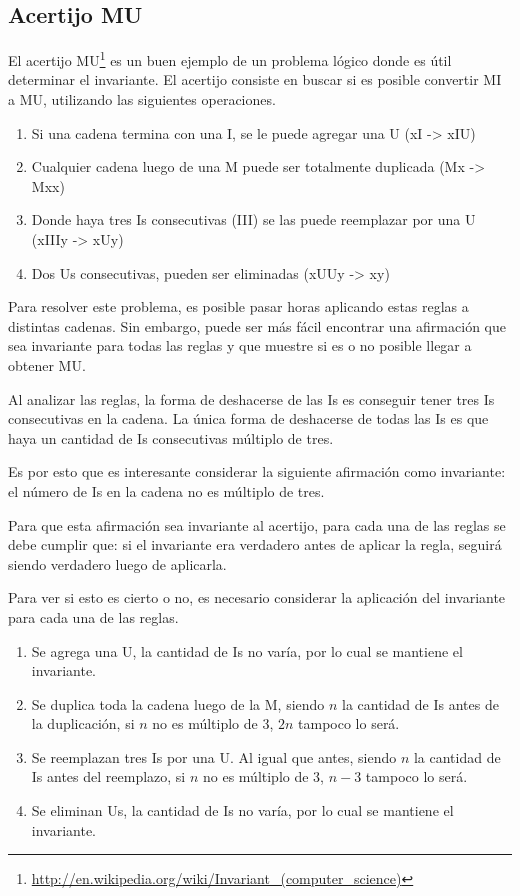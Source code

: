 \newpage
\begin{subappendices}
\section{Acertijo MU}

El acertijo MU\footnote{%
\url{http://en.wikipedia.org/wiki/Invariant\_(computer\_science)}} es un buen
ejemplo de un problema lógico donde es útil determinar el invariante.  El
acertijo consiste en buscar si es posible convertir MI a MU, utilizando las
siguientes operaciones.

\begin{enumerate}
\item Si una cadena termina con una I, se le puede agregar una U (xI -> xIU)
\item Cualquier cadena luego de una M puede ser totalmente duplicada (Mx ->
Mxx)
\item Donde haya tres Is consecutivas (III) se las puede reemplazar por una U
(xIIIy -> xUy)
\item Dos Us consecutivas, pueden ser eliminadas (xUUy -> xy)
\end{enumerate}

Para resolver este problema, es posible pasar horas aplicando estas reglas
a distintas cadenas.  Sin embargo, puede ser más fácil encontrar una
afirmación que sea invariante para todas las reglas y que muestre si es o
no posible llegar a obtener MU.

Al analizar las reglas, la forma de deshacerse de las Is es conseguir tener
tres Is consecutivas en la cadena.  La única forma de deshacerse de todas las
Is es que haya un cantidad de Is consecutivas múltiplo de tres.

Es por esto que es interesante considerar la siguiente afirmación como
invariante: el número de Is en la cadena no es múltiplo de tres.

Para que esta afirmación sea invariante al acertijo, para
cada una de las reglas se debe cumplir que: si el invariante era verdadero
antes de aplicar la regla, seguirá siendo verdadero luego de aplicarla.

Para ver si esto es cierto o no, es necesario considerar la aplicación del
invariante para cada una de las reglas.

\begin{enumerate}
\item Se agrega una U, la cantidad de Is no varía, por lo cual se mantiene el
invariante.
\item Se duplica toda la cadena luego de la M, siendo $n$ la cantidad de
Is antes de la duplicación, si $n$ no es múltiplo de 3, $2n$ tampoco lo será.
\item Se reemplazan tres Is por una U.  Al igual que antes, siendo $n$ la
cantidad de Is antes del reemplazo, si $n$ no es múltiplo de 3, $n-3$ tampoco
lo será.
\item Se eliminan Us, la cantidad de Is no varía, por lo cual se mantiene el
invariante.
\end{enumerate}


\end{subappendices}
